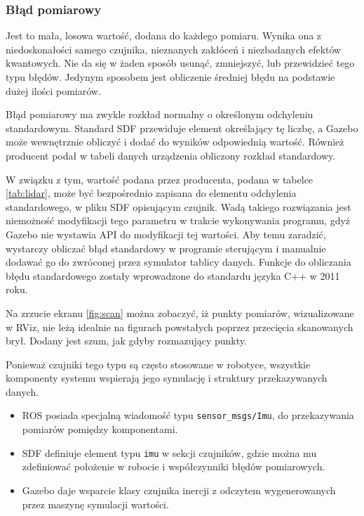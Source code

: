 		\subsubsection{Błąd pomiarowy}
			Jest to mała, losowa wartość, dodana do każdego pomiaru.
			Wynika ona z niedoskonałości samego czujnika, nieznanych zakłóceń i niezbadanych efektów kwantowych.
			Nie da się w żaden sposób usunąć, zmniejszyć, lub przewidzieć tego typu błędów.
			Jedynym sposobem jest obliczenie średniej błędu na podstawie dużej ilości pomiarów.

			Błąd pomiarowy ma zwykle rozkład normalny o określonym odchyleniu standardowym.
			Standard SDF przewiduje element określający tę liczbę, a Gazebo może wewnętrznie obliczyć i dodać do wyników odpowiednią wartość.
			Również producent podał w tabeli danych urządzenia obliczony rozkład standardowy.

			W związku z tym, wartość podana przez producenta, podana w tabelce \ref{tab:lidar}, może być bezpośrednio zapisana do 
			elementu odchylenia standardowego, w pliku SDF opisującym czujnik.
			Wadą takiego rozwiązania jest niemożność modyfikacji tego parametru w trakcie wykonywania programu, gdyż Gazebo nie wystawia API do modyfikacji tej wartości.
			Aby temu zaradzić, wystarczy obliczać błąd standardowy w programie sterującym i manualnie dodawać go do zwróconej przez symulator tablicy danych.
			Funkcje do obliczania błędu standardowego zostały wprowadzone do standardu języka C++ w 2011 roku.
			
			Na zrzucie ekranu \ref{fig:scan} można zobaczyć, iż punkty pomiarów, wizualizowane w RViz, nie leżą idealnie na figurach powstałych poprzez przecięcia skanowanych brył.
			Dodany jest szum, jak gdyby rozmazujący punkty.
		
		Ponieważ czujniki tego typu są często stosowane w robotyce, wszystkie komponenty systemu wspierają jego symulację i struktury przekazywanych danych.
	\begin{itemize}
		\item ROS posiada specjalną wiadomość typu \texttt{sensor\_msgs/Imu}, do przekazywania pomiarów pomiędzy komponentami.
		\item SDF definiuje element typu \texttt{imu} w sekcji czujników, gdzie można mu zdefiniować położenie w robocie i współczynniki błędów pomiarowych.
		\item Gazebo daje wsparcie klasy czujnika inercji z odczytem wygenerowanych przez maszynę symulacji wartości.
	\end{itemize}
	
